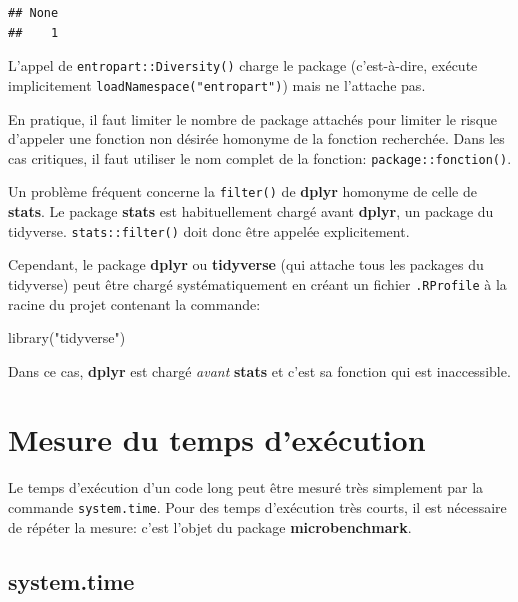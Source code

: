 \documentclass[
  11pt,
  french,
  a4paper,
  extrafontsizes,onecolumn,openright
  ]{memoir}
\newenvironment{Shaded}{\begin{snugshade}}{\end{snugshade}}
\newcommand{\FunctionTok}[1]{\textcolor[rgb]{0.00,0.00,0.00}{#1}}
\newcommand{\NormalTok}[1]{#1}
\newcommand{\StringTok}[1]{\textcolor[rgb]{0.31,0.60,0.02}{#1}}
\begin{document}
\begin{verbatim}
## None 
##    1
\end{verbatim}

\normalsize

L'appel de \texttt{entropart::Diversity()} charge le package (c'est-à-dire, exécute implicitement \texttt{loadNamespace("entropart")}) mais ne l'attache pas.

En pratique, il faut limiter le nombre de package attachés pour limiter le risque d'appeler une fonction non désirée homonyme de la fonction recherchée.
Dans les cas critiques, il faut utiliser le nom complet de la fonction: \texttt{package::fonction()}.

Un problème fréquent concerne la \texttt{filter()} de \textbf{dplyr} homonyme de celle de \textbf{stats}.
Le package \textbf{stats} est habituellement chargé avant \textbf{dplyr}, un package du tidyverse.
\texttt{stats::filter()} doit donc être appelée explicitement.

Cependant, le package \textbf{dplyr} ou \textbf{tidyverse} (qui attache tous les packages du tidyverse) peut être chargé systématiquement en créant un fichier \texttt{.RProfile} à la racine du projet contenant la commande:

\scriptsize

\begin{Shaded}
\begin{Highlighting}[]
\FunctionTok{library}\NormalTok{(}\StringTok{"tidyverse"}\NormalTok{)}
\end{Highlighting}
\end{Shaded}

\normalsize

Dans ce cas, \textbf{dplyr} est chargé \emph{avant} \textbf{stats} et c'est sa fonction qui est inaccessible.

\hypertarget{mesure-du-temps-dexuxe9cution}{%
\section{Mesure du temps d'exécution}\label{mesure-du-temps-dexuxe9cution}}

Le temps d'exécution d'un code long peut être mesuré très simplement par la commande \texttt{system.time}.
Pour des temps d'exécution très courts, il est nécessaire de répéter la mesure: c'est l'objet du package \textbf{microbenchmark}.

\hypertarget{system.time}{%
\subsection{system.time}\label{system.time}}
\end{document}
